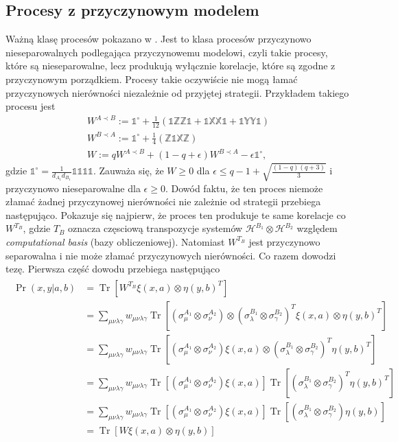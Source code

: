 \documentclass[10pt]{article} %
\DeclareMathOperator{\Trs}{Tr}
\newcommand{\Hx}[1]{\mathcal{H}^{#1}}
\newcommand{\X}{\mathbb{X}}
\newcommand{\Y}{\mathbb{Y}}
\newcommand{\Z}{\mathbb{Z}}
\newcommand{\I}{\mathbb{1}}
\newcommand{\IO}{\mathbb{1}^\circ}
\begin{document}
\subsection{Procesy z przyczynowym modelem}
Ważną klasę procesów pokazano w \cite{causal_model}. Jest to klasa procesów przyczynowo nieseparowalnych podlegająca przyczynowemu modelowi, czyli takie procesy, które są nieseparowalne, lecz produkują wyłącznie korelacje, które są zgodne z przyczynowym porządkiem. Procesy takie oczywiście nie mogą
łamać przyczynowych nierówności niezależnie od przyjętej strategii. Przykładem takiego procesu jest 
\begin{gather}
W^{A \prec B} := \IO + \frac{1}{12}(\I\Z\Z\I + \I\X\X\I + \I\Y\Y\I) \\
W^{B \prec A} := \IO + \frac{1}{4}(\Z\I\X\Z)\\
\label{eq:nsep_causal}
W := qW^{A \prec B} + (1-q+\epsilon)W^{B \prec A} -\epsilon\IO,
\end{gather} gdzie $\IO = \frac{1}{d_{A_1}d_{B_1}} \I\I\I\I$.
Zauważa się, że $W \geq 0$ dla $\epsilon \leq q- 1 + \sqrt{\frac{(1-q)(q+3)}{3}}$ i przyczynowo nieseparowalne dla $\epsilon \geq 0$. 
Dowód faktu, że ten proces niemoże złamać żadnej przyczynowej nierówności nie zależnie od strategii przebiega następująco.
Pokazuje się najpierw, że proces ten produkuje te same korelacje co $W^{T_B}$, gdzie $T_B$ oznacza częsciową transpozycje systemów $\Hx{B_1} \otimes \Hx{B_2}$ względem \textit{computational basis} (bazy obliczeniowej). Natomiast $W^{T_B}$ jest przyczynowo separowalna i nie może złamać przyczynowych nierówności. Co razem dowodzi tezę. Pierwsza część dowodu przebiega następująco 
\begin{align}
\begin{split}
\Pr(x,y|a,b) &= \Trs\left[W^{T_B} \xi(x,a) \otimes \eta(y,b)^{T}\right] \\
	&= \sum_{\mu\nu\lambda\gamma} w_{\mu\nu\lambda\gamma} \Trs \left[ (\sigma_\mu^{A_1}\otimes\sigma_\nu^{A_2})\otimes(\sigma_\lambda^{B_1}\otimes\sigma_\gamma^{B_2})^T \xi(x,a) \otimes \eta(y,b)^{T} \right] \\
	&= \sum_{\mu\nu\lambda\gamma} w_{\mu\nu\lambda\gamma} \Trs \left[ (\sigma_\mu^{A_1}\otimes\sigma_\nu^{A_2}) \xi(x,a) \otimes (\sigma_\lambda^{B_1}\otimes\sigma_\gamma^{B_2})^T\eta(y,b)^{T} \right] \\
	&= \sum_{\mu\nu\lambda\gamma} w_{\mu\nu\lambda\gamma}  \Trs \left[ (\sigma_\mu^{A_1}\otimes\sigma_\nu^{A_2}) \xi(x,a)\right] \Trs \left[ (\sigma_\lambda^{B_1}\otimes\sigma_\gamma^{B_2})^T\eta(y,b)^{T} \right] \\
	&= \sum_{\mu\nu\lambda\gamma} w_{\mu\nu\lambda\gamma}  \Trs \left[ (\sigma_\mu^{A_1}\otimes\sigma_\nu^{A_2}) \xi(x,a)\right] \Trs \left[ (\sigma_\lambda^{B_1}\otimes\sigma_\gamma^{B_2})\eta(y,b) \right] \\
	&=  \Trs\left[W \xi(x,a) \otimes \eta(y,b)\right]
\end{split}
\end{align}
\end{document}
